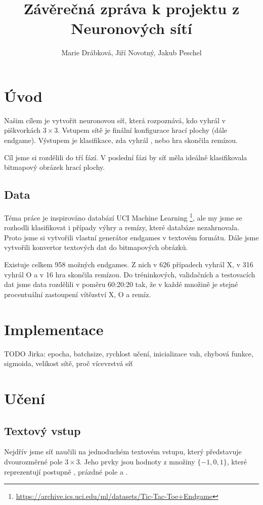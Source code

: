 \documentclass[10pt,a4paper]{article}
\title{Závěrečná zpráva k projektu z Neuronových sítí}
\author{Marie Drábková, Jiří Novotný, Jakub Peschel}
\begin{document}
\maketitle

\section*{Úvod}
Našim cílem je vytvořit neuronovou síť, která rozpoznává, kdo vyhrál v piškvorkách $3\times 3$. Vstupem sítě je finální konfigurace hrací plochy (dále endgame). Výstupem je klasifikace, zda vyhrál  ,  nebo hra skončila remízou. 

Cíl jsme si rozdělili do tří fází. V poslední fázi by síť měla ideálně klasifikovala bitmapový obrázek hrací plochy.


\subsection*{Data}
Téma práce je inspirováno databází UCI Machine Learning \footnote{\url{https://archive.ics.uci.edu/ml/datasets/Tic-Tac-Toe+Endgame}}, ale my jsme se rozhodli klasifikovat i případy výhry  a remízy, které databáze nezahrnovala. Proto jsme si vytvořili vlastní generátor endgames v textovém formátu. Dále jsme vytvořili konvertor textových dat do bitmapových obrázků.

Existuje celkem 958 možných endgames. Z nich v 626 případech vyhrál X, v 316 vyhrál O a v 16 hra skončila remízou. Do tréninkových, validačních a testovacích dat jsme data rozdělili v poměru 60:20:20 tak, že v každé množině je stejné procentuální zastoupení vítězství X, O a remíz.

\section*{Implementace}
TODO Jirka: epocha, batchsize, rychlost učení, inicializace vah, chybová funkce, sigmoida, velikost sítě, proč vícevrstvá síť


\section*{Učení}
\subsection*{Textový vstup}
Nejdřív jsme síť naučili na jednoduchém textovém vstupu, který představuje dvourozměrné pole $3\times 3$. Jeho prvky jsou hodnoty z množiny $\{-1,0,1\}$, které reprezentují  postupně , prázdné pole a .
\end{document}

